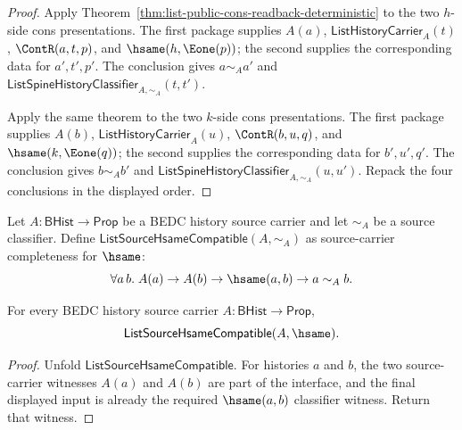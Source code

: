 \begin{proof}
Apply Theorem~\ref{thm:list-public-cons-readback-deterministic} to the two
$h$-side cons presentations. The first package supplies $A(a)$,
$\mathsf{ListHistoryCarrier}_A(t)$, $\ContR(a,t,p)$, and
$\hsame(h,\Eone(p))$; the second supplies the corresponding data for
$a',t',p'$. The conclusion gives $a\sim_A a'$ and
$\mathsf{ListSpineHistoryClassifier}_{A,\sim_A}(t,t')$.

Apply the same theorem to the two $k$-side cons presentations. The first
package supplies $A(b)$, $\mathsf{ListHistoryCarrier}_A(u)$,
$\ContR(b,u,q)$, and $\hsame(k,\Eone(q))$; the second supplies the
corresponding data for $b',u',q'$. The conclusion gives $b\sim_A b'$ and
$\mathsf{ListSpineHistoryClassifier}_{A,\sim_A}(u,u')$. Repack the four
conclusions in the displayed order.
\end{proof}

\begin{definition}
\label{def:list-source-hsame-compatible}
Let $A:\mathsf{BHist}\to\mathsf{Prop}$ be a BEDC history source carrier and let
$\sim_A$ be a source classifier. Define
$\mathsf{ListSourceHsameCompatible}(A,\sim_A)$ as source-carrier completeness for
$\hsame$:
$$
\forall a\,b.\;
A(a)\to A(b)\to \hsame(a,b)\to a\sim_A b.
$$
\end{definition}

\begin{theorem}
\label{thm:list-source-hsame-compatible-hsame}
For every BEDC history source carrier $A:\mathsf{BHist}\to\mathsf{Prop}$,
$$
\mathsf{ListSourceHsameCompatible}(A,\hsame).
$$
\end{theorem}
\begin{proof}
Unfold $\mathsf{ListSourceHsameCompatible}$. For histories $a$ and $b$, the
two source-carrier witnesses $A(a)$ and $A(b)$ are part of the interface, and
the final displayed input is already the required $\hsame(a,b)$ classifier
witness. Return that witness.
\end{proof}

